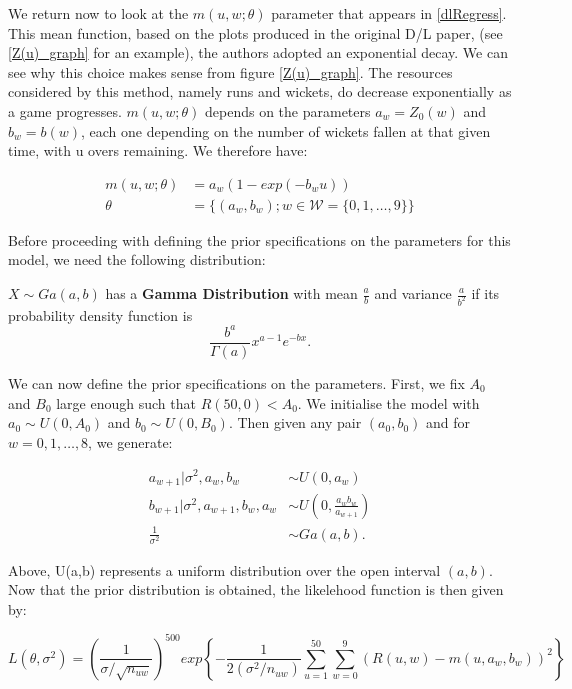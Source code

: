 We return now to look at the $m(u,w;\theta)$ parameter that appears in \ref{dlRegress}. This mean function, based on the plots produced in the original D/L
paper, (see \ref{Z(u)_graph} for an example), the authors adopted an exponential decay. We can see why this choice makes sense from figure \ref{Z(u)_graph}.
The resources considered by this method, namely runs and wickets, do decrease exponentially as a game progresses. $m(u,w;\theta)$ depends on the parameters
$a_w = Z_0(w)$ and $b_w = b(w)$, each one depending on the number of wickets fallen at that given time, with u overs remaining. We therefore have:

\begin{align}
    \label{mdef}
        m(u,w;\theta) &= a_w(1-exp(-b_wu)) \\
               \theta &= \{ (a_w,b_w); w \in \mathcal{W}=\{0,1,\ldots,9\} \} 
\end{align}

Before proceeding with defining the prior specifications on the parameters for this model, we need the following distribution:

\begin{definition}
    $X \sim Ga(a,b)$ has a \textbf{Gamma Distribution} with mean $\frac{a}{b}$ and variance $\frac{a}{b^2}$ if its probability density function is
    $$
        \frac{b^a}{\Gamma(a)} x^{a-1}e^{-bx}.  
    $$
\end{definition}

We can now define the prior specifications on the parameters. First, we fix $A_0$ and $B_0$ large enough such that $R(50,0) < A_0$. We initialise  the model with
$a_0 \sim U(0,A_0)$ and $b_0 \sim U(0,B_0)$. Then given any pair $(a_0,b_0)$ and for $w=0,1,\ldots,8$, we generate:

\begin{align}
    a_{w+1}|\sigma^2,a_w,b_w &\sim U(0,a_w) \\
    b_{w+1}|\sigma^2,a_{w+1},b_w,a_w &\sim U\left(0,\frac{a_wb_w}{a_{w+1}}\right) \\
    \frac{1}{\sigma^2} &\sim Ga(a,b).
\end{align}

Above, U(a,b) represents a uniform distribution over the open interval $(a,b)$. Now that the prior distribution is obtained, the likelehood function is then 
given by:

\begin{equation}
    L(\theta,\sigma^2) = \left( \frac{1}{\sigma / \sqrt{n_{uw}}} \right)^{500} exp \left\{ - \frac{1}{2(\sigma^2 / n_{uw})} \sum_{u=1}^{50} \sum_{w=0}^9 (R(u,w)-m(u,a_w,b_w))^2  \right\}
\end{equation}

